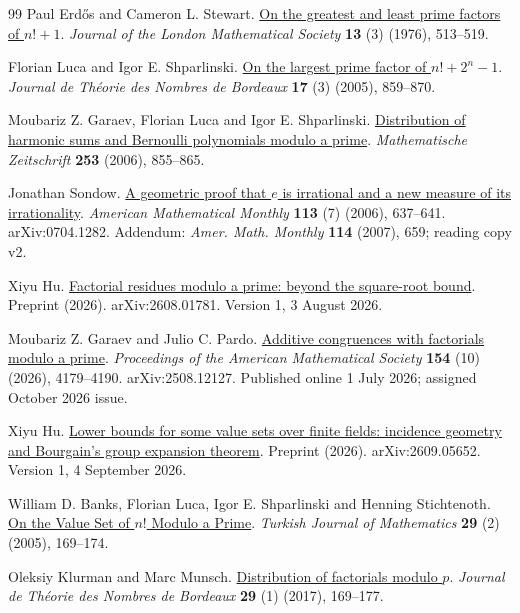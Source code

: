 \documentclass[11pt]{article}
\begin{document}
\begin{thebibliography}{99}
Paul Erd{\H o}s and Cameron L. Stewart. \href{https://doi.org/10.1112/jlms/s2-13.3.513}{On the greatest and least prime factors of {$n!+1$}}.
\emph{Journal of the London Mathematical Society} \textbf{13} (3) (1976), 513--519.

Florian Luca and Igor E. Shparlinski. \href{https://doi.org/10.5802/jtnb.524}{On the largest prime factor of {$n!+2^n-1$}}.
\emph{Journal de Th{\'e}orie des Nombres de Bordeaux} \textbf{17} (3) (2005), 859--870.

Moubariz Z. Garaev, Florian Luca and Igor E. Shparlinski. \href{https://doi.org/10.1007/s00209-006-0939-5}{Distribution of harmonic sums and {Bernoulli} polynomials modulo a prime}.
\emph{Mathematische Zeitschrift} \textbf{253} (2006), 855--865.

Jonathan Sondow. \href{https://arxiv.org/abs/0704.1282v2}{A geometric proof that {$e$} is irrational and a new measure of its irrationality}.
\emph{American Mathematical Monthly} \textbf{113} (7) (2006), 637--641. arXiv:0704.1282. Addendum: \emph{Amer. Math. Monthly} \textbf{114} (2007), 659; reading copy v2.

Xiyu Hu. \href{https://arxiv.org/abs/2608.01781v1}{Factorial residues modulo a prime: beyond the square-root bound}.
Preprint (2026). arXiv:2608.01781. Version 1, 3 August 2026.

Moubariz Z. Garaev and Julio C. Pardo. \href{https://doi.org/10.1090/proc/17753}{Additive congruences with factorials modulo a prime}.
\emph{Proceedings of the American Mathematical Society} \textbf{154} (10) (2026), 4179--4190. arXiv:2508.12127. Published online 1 July 2026; assigned October 2026 issue.

Xiyu Hu. \href{https://arxiv.org/abs/2609.05652v1}{Lower bounds for some value sets over finite fields: incidence geometry and {Bourgain}'s group expansion theorem}.
Preprint (2026). arXiv:2609.05652. Version 1, 4 September 2026.

William D. Banks, Florian Luca, Igor E. Shparlinski and Henning Stichtenoth. \href{https://journals.tubitak.gov.tr/math/vol29/iss2/6/}{On the Value Set of $n!$ Modulo a Prime}.
\emph{Turkish Journal of Mathematics} \textbf{29} (2) (2005), 169--174.

Oleksiy Klurman and Marc Munsch. \href{https://doi.org/10.5802/jtnb.974}{Distribution of factorials modulo $p$}.
\emph{Journal de Théorie des Nombres de Bordeaux} \textbf{29} (1) (2017), 169--177.


\end{thebibliography}
\end{document}
